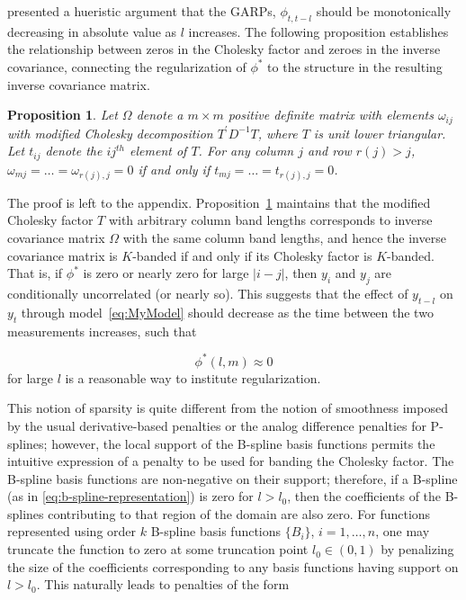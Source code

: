 \documentclass[12pt]{article}
\newtheorem{proposition}[theorem]{Proposition}
\theoremstyle{definition}
\begin{document}
\cite{pourahmadi1999joint} presented a hueristic argument that the GARPs, $\phi_{t,t-l}$ should be monotonically decreasing in absolute value as $l$ increases. The following proposition establishes the relationship between zeros in the Cholesky factor and zeroes in the inverse covariance, connecting the regularization of $\phi^*$  to the structure in the resulting inverse covariance matrix. 

\begin{proposition} \label{prop:cholesky-inverse-banding-equivalence}
Let $\Omega$ denote a $m \times m$ positive definite matrix with elements $\omega_{ij}$ with modified Cholesky decomposition $T^\prime D^{-1} T$, where $T$ is unit lower triangular. Let  $t_{ij}$ denote the $ij^{th}$ element of $T$. For any column $j$ and row $r\left(j\right) > j$,  $\omega_{mj} = \dots = \omega_{r\left(j\right),j} = 0$ if and only if  $t_{mj} = \dots = t_{r\left(j\right),j} = 0$.
\end{proposition}


The proof is left to the appendix. Proposition~\ref{prop:cholesky-inverse-banding-equivalence} maintains that the modified Cholesky factor $T$ with arbitrary column band lengths corresponds to inverse covariance matrix $\Omega$ with the same column band lengths, and hence the inverse covariance matrix is $K$-banded if and only if its Cholesky factor is $K$-banded. That is, if $\phi^*$ is zero or nearly zero for  large $\vert i-j \vert$, then $y_i$ and $y_j$ are conditionally uncorrelated (or nearly so). This suggests that the effect of $y_{t-l}$ on $y_t$ through model~\ref{eq:MyModel} should decrease as the time between the two measurements increases, such that
 
\[
\phi^*\left(l,m\right) \approx 0
\]
\noindent
for large $l$ is a reasonable way to institute regularization. 


This notion of sparsity is quite different from the notion of smoothness imposed by the usual derivative-based penalties or the analog difference penalties for P-splines; however, the local support of the B-spline basis functions permits the intuitive expression of a penalty to be used for banding the Cholesky factor. The B-spline basis functions are non-negative on their support; therefore, if a B-spline (as in \ref{eq:b-spline-representation}) is zero for $l > l_0$, then the coefficients of the B-splines contributing to that region of the domain are also zero. For functions represented using order $k$ B-spline basis functions $\lbrace B_i \rbrace$, $i=1,\dots,n$, one may truncate the function to zero at some truncation point $l_0 \in \left(0,1\right)$ by penalizing the size of the coefficients corresponding to any basis functions having support on $l > l_0$. This naturally leads to penalties of the form
\end{document}
